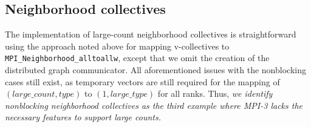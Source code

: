 
\subsection{Neighborhood collectives}


The implementation of large-count neighborhood collectives is straightforward
using the approach noted above for mapping v-collectives to \texttt{MPI\_Neighborhood\_alltoallw},
except that we omit the creation of the distributed graph communicator.
All aforementioned issues with the nonblocking cases still exist, as temporary vectors
are still required for the mapping of $(large\_count,type)$ to $(1,large\_type)$ for all ranks.
Thus, \textit{we identify nonblocking neighborhood collectives as the third example
where MPI-3 lacks the necessary features to support large counts.}